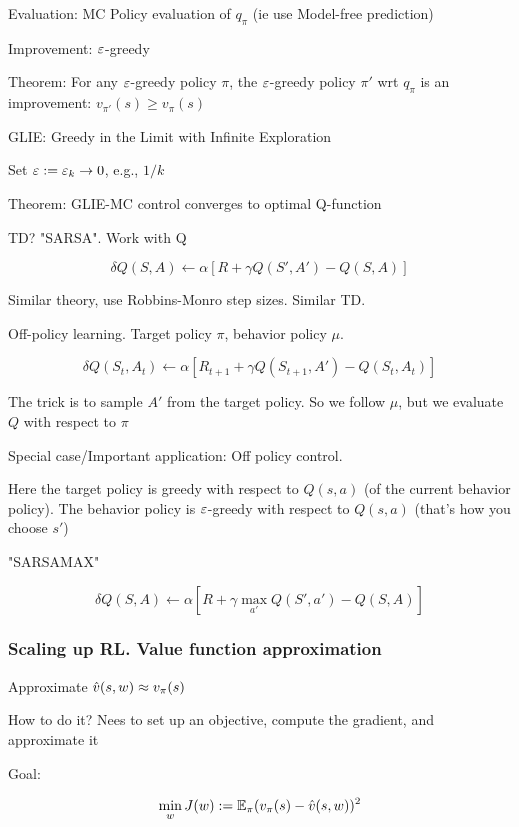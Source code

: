 \documentclass[english]{article}
\begin{document}
Evaluation: MC Policy evaluation of $q_\pi$ (ie use Model-free prediction)

Improvement: $\varepsilon$-greedy

\item Theorem: For any $\varepsilon$-greedy policy $\pi$, the $\varepsilon$-greedy policy $\pi'$ wrt $q_\pi$ is an improvement: $v_{\pi'}(s) \ge v_\pi(s)$

\item GLIE: Greedy in the Limit with Infinite Exploration

Set $\varepsilon:=\varepsilon_k\to 0$, e.g., $1/k$


Theorem: GLIE-MC control converges to optimal Q-function

\item TD? "SARSA". Work with Q

$$\delta Q(S,A)
\gets
\alpha [
R+\gamma Q(S',A')-Q(S,A)]
$$

Similar theory, use Robbins-Monro step sizes. Similar TD.

\item Off-policy learning. Target policy $\pi$, behavior policy $\mu$. 

$$\delta Q(S_t,A_t)
\gets
\alpha [
R_{t+1}+\gamma Q(S_{t+1},A')-Q(S_{t},A_{t})]
$$

The trick is to sample $A'$ from the target policy. So we follow $\mu$, but we evaluate $Q$ with respect to $\pi$

\item Special case/Important application: Off policy control. 

Here the target policy is greedy with respect to $Q(s,a)$ (of the current behavior policy). The behavior policy is $\varepsilon$-greedy with respect to $Q(s,a)$ (that's how you choose $s'$)

"SARSAMAX"

$$\delta Q(S,A)
\gets
\alpha [
R+\gamma \max_{a'} Q(S',a')-Q(S,A)]
$$


\eenum 


\subsubsection{Scaling up RL. Value function approximation}
\benum
\item Approximate $\hat{v} (s,w) \approx v_\pi(s)$

How to do it? Nees to set up an objective, compute the gradient, and approximate it

Goal: 

$$\min_w J(w):=\mathbb{E}_\pi(v_\pi(s)-\hat{v}(s,w))^2
$$
\end{document}
